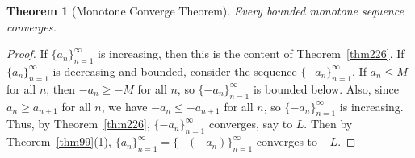 \documentclass[12pt]{amsart}
\numberwithin{equation}{section}
\theoremstyle{plain} %
\newtheorem{thm}[equation]{Theorem}
\theoremstyle{definition}
\theoremstyle{remark}
\begin{document}
\begin{thm}[Monotone Converge Theorem]\label{thm:MCT} Every bounded monotone sequence converges.
\end{thm}
\begin{proof}
If $\{a_n\}_{n=1}^\infty$ is increasing, then this is the content of Theorem~\ref{thm226}. If $\{a_n\}_{n=1}^\infty$ is decreasing and bounded, consider the sequence $\{-a_n\}_{n=1}^\infty$. If $a_n\leq M$ for all $n$, then $-a_n\geq -M$ for all $n$, so $\{-a_n\}_{n=1}^\infty$ is bounded below. Also, since $a_n \geq a_{n+1}$ for all $n$, we have $-a_n \leq -a_{n+1}$ for all $n$, so $\{-a_n\}_{n=1}^\infty$ is increasing. Thus, by Theorem~\ref{thm226}, $\{-a_n\}_{n=1}^\infty$ converges, say to $L$. Then by Theorem~\ref{thm99}(1), $\{a_n\}_{n=1}^\infty=\{-(-a_n)\}_{n=1}^\infty$ converges to $-L$.
\end{proof}

	
\end{document}
